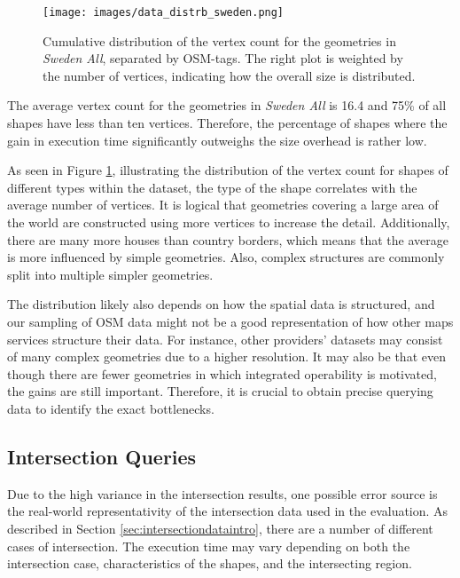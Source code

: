 \begin{figure}[H]
    \centering
    \texttt{[image: images/data\_distrb\_sweden.png]}
    \caption{Cumulative distribution of the vertex count for the geometries in \emph{Sweden All}, separated by OSM-tags. The right plot is weighted by the number of vertices, indicating how the overall size is distributed.}
    \label{img:data_distrb_sweden}
\end{figure}

The average vertex count for the geometries in \textit{Sweden All} is 16.4 and 75\% of all shapes have less than ten vertices. Therefore, the percentage of shapes where the gain in execution time significantly outweighs the size overhead is rather low. 

As seen in Figure \ref{img:data_distrb_sweden}, illustrating the distribution of the vertex count for shapes of different types within the dataset, the type of the shape correlates with the average number of vertices. It is logical that geometries covering a large area of the world are constructed using more vertices to increase the detail. Additionally, there are many more houses than country borders, which means that the average is more influenced by simple geometries. Also, complex structures are commonly split into multiple simpler geometries.

The distribution likely also depends on how the spatial data is structured, and our sampling of OSM data might not be a good representation of how other maps services structure their data. For instance, other providers' datasets may consist of many complex geometries due to a higher resolution. It may also be that even though there are fewer geometries in which integrated operability is motivated, the gains are still important. Therefore, it is crucial to obtain precise querying data to identify the exact bottlenecks.

\subsection{Intersection Queries}
Due to the high variance in the intersection results, one possible error source is the real-world representativity of the intersection data used in the evaluation. As described in Section \ref{sec:intersectiondataintro}, there are a number of different cases of intersection. The execution time may vary depending on both the intersection case, characteristics of the shapes, and the intersecting region.

